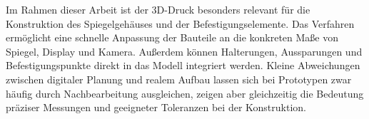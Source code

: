 Im Rahmen dieser Arbeit ist der 3D-Druck besonders relevant für die Konstruktion des Spiegelgehäuses und der Befestigungselemente. Das Verfahren ermöglicht eine schnelle Anpassung der Bauteile an die konkreten Maße von Spiegel, Display und Kamera. Außerdem können Halterungen, Aussparungen und Befestigungspunkte direkt in das Modell integriert werden. Kleine Abweichungen zwischen digitaler Planung und realem Aufbau lassen sich bei Prototypen zwar häufig durch Nachbearbeitung ausgleichen, zeigen aber gleichzeitig die Bedeutung präziser Messungen und geeigneter Toleranzen bei der Konstruktion.